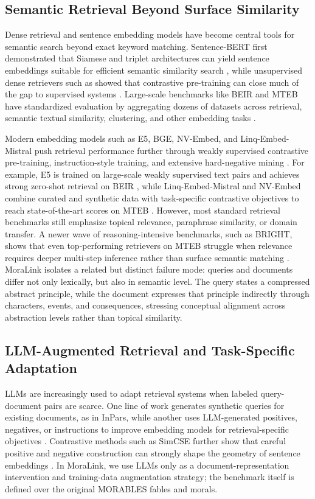 \documentclass[11pt]{article}
\begin{document}
\subsection{Semantic Retrieval Beyond Surface Similarity}
Dense retrieval and sentence embedding models have become central tools for semantic search beyond exact keyword matching. Sentence-BERT first demonstrated that Siamese and triplet architectures can yield sentence embeddings suitable for efficient semantic similarity search \citep{reimers2019sentence}, while unsupervised dense retrievers such as  showed that contrastive pre-training can close much of the gap to supervised systems . Large-scale benchmarks like BEIR and MTEB have standardized evaluation by aggregating dozens of datasets across retrieval, semantic textual similarity, clustering, and other embedding tasks \citep{thakur2021beir,muennighoff-etal-2023-mteb}.

Modern embedding models such as E5, BGE, NV-Embed, and Linq-Embed-Mistral push retrieval performance further through weakly supervised contrastive pre-training, instruction-style training, and extensive hard-negative mining \citep{wang2022text,xiao2024c,lee2025nv,choi2024linq}. For example, E5 is trained on large-scale weakly supervised text pairs and achieves strong zero-shot retrieval on BEIR \citep{wang2022text}, while Linq-Embed-Mistral and NV-Embed combine curated and synthetic data with task-specific contrastive objectives to reach state-of-the-art scores on MTEB \citep{choi2024linq,lee2025nv}. However, most standard retrieval benchmarks still emphasize topical relevance, paraphrase similarity, or domain transfer. A newer wave of reasoning-intensive benchmarks, such as BRIGHT, shows that even top-performing retrievers on MTEB struggle when relevance requires deeper multi-step inference rather than surface semantic matching
\citep{su2025bright}. MoraLink isolates a related but distinct failure mode: queries and documents differ not only lexically, but also in semantic level. The query states a compressed abstract principle, while the document expresses that principle indirectly through characters, events, and consequences, stressing conceptual alignment across abstraction levels rather than topical similarity.


\subsection{LLM-Augmented Retrieval and Task-Specific Adaptation}
LLMs are increasingly used to adapt retrieval systems when labeled query-document
pairs are scarce. One line of work generates synthetic queries for existing
documents, as in InPars, while another uses LLM-generated positives, negatives,
or instructions to improve embedding models for retrieval-specific objectives
\citep{bonifacio2022inpars,wang2024improving}. Contrastive methods such as
SimCSE further show that careful positive and negative construction can strongly
shape the geometry of sentence embeddings \citep{gao2021simcse}. In MoraLink,
we use LLMs only as a document-representation intervention and training-data
augmentation strategy; the benchmark itself is defined over the original
MORABLES fables and morals.
\end{document}
